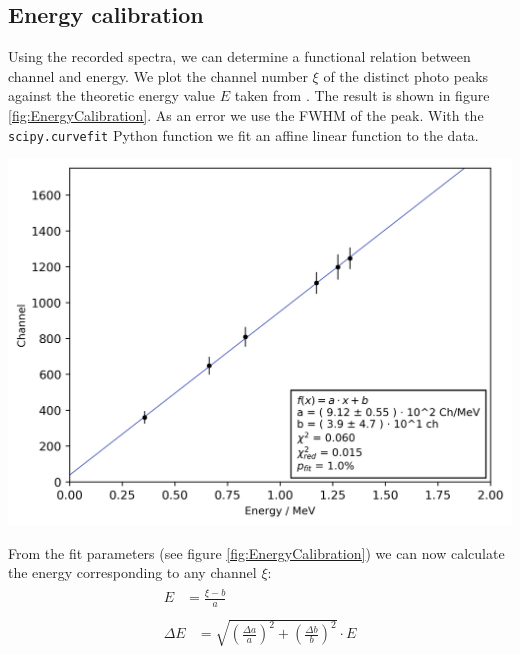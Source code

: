 \subsection{Energy calibration}
%
Using the recorded spectra, we can determine a functional relation between channel and energy.
We plot the channel number $\xi$ of the distinct photo peaks against the theoretic energy value $E$ taken from \cite{Anleitung}.
The result is shown in figure \ref{fig:EnergyCalibration}.
As an error we use the FWHM of the peak.
With the \texttt{scipy.curvefit} Python function we fit an affine linear function to the data.
%
\par
%
\minipage{\linewidth}
    \begin{center}
        \captionsetup{type=figure}
        \begin{adjustbox}{max width=\linewidth, keepaspectratio}
            \includegraphics[]{png/energy_calibration}
        \end{adjustbox}
        \label{fig:EnergyCalibration}
    \end{center}
\endminipage
%
\par
%
From the fit parameters (see figure \ref{fig:EnergyCalibration}) we can now calculate the energy corresponding to any channel $\xi$:
\begin{align}
    \label{eq:}
    \begin{split}
        E &= \frac{\xi - b}{a}
    \end{split}
    \\
    \label{eq:}
    \begin{split}
        \Delta E &= \sqrt{ \left ( \frac{ \Delta a}{ a } \right ) ^2 + \left ( \frac{\Delta b}{b} \right ) ^2 } \cdot E
    \end{split}
\end{align}
%
